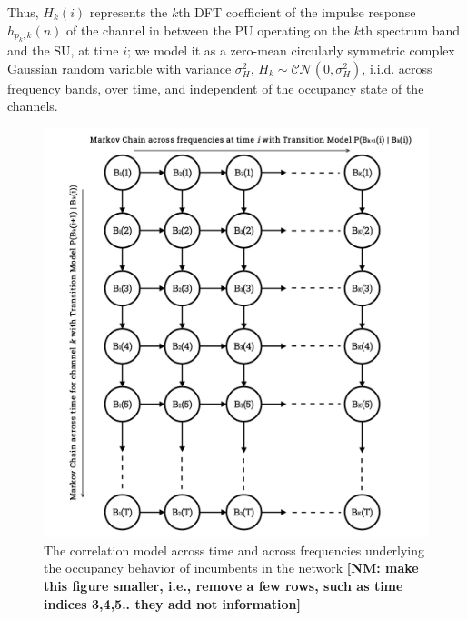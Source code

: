 \documentclass[10pt,twocolumn]{IEEEtran}
\newcommand{\nm}[1]{{\color{blue}\bf{[NM: #1]}}}
\begin{document}
Thus, $H_k(i)$ represents the $k$th DFT coefficient of the impulse response $h_{p_k,k}(n)$ of the channel in between the PU operating on the $k$th spectrum band and the SU, at time $i$; we model it as a zero-mean circularly symmetric complex Gaussian random variable with variance $\sigma_H^2$, $H_k {\sim} \mathcal{CN}(0,\sigma_H^2)$, i.i.d. across frequency bands, over time, and independent of the occupancy state of the channels.
\begin{figure}
    \centering
    \includegraphics[scale=0.063]{minerva_occupancy_markov_chain.png}
    \caption{The correlation model across time and across frequencies underlying the occupancy behavior of incumbents in the network
    \nm{make this figure smaller, i.e., remove a few rows, such as time indices 3,4,5.. they add not information}
    }
    \label{fig:1}
\end{figure}
\end{document}
